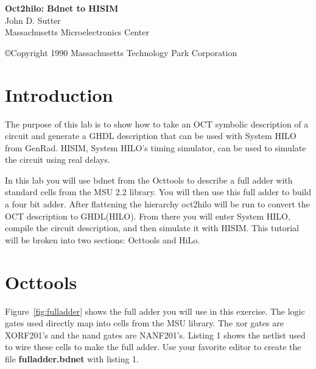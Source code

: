


\begin{titlepage}
\begin{center}
\vspace*{2in}
{\LARGE\bf Oct2hilo: Bdnet to HISIM \\[2ex]}
{\Large John D. Sutter \\[1ex]
Massachusetts Microelectronics Center \\[.5ex]
\mmc}
\end{center}

\vspace*{3.2in}
\copyright Copyright 1990 Massachusetts Technology Park Corporation
\end{titlepage}
\tableofcontents

\newpage

\section{Introduction}

  The purpose of this lab is to show how to take an OCT
symbolic description of a circuit and generate a GHDL
description that can be used with System HILO from GenRad.
HISIM, System HILO's timing simulator, can be used
to simulate the circuit using real delays.

  In this lab you will use bdnet from the Octtools to describe
a full adder with standard cells from the MSU 2.2 library.  
You will then use this full adder to build a four bit adder.  
After flattening the hierarchy oct2hilo will be run to convert
the OCT description to GHDL(HILO).  From there you will enter
System HILO, compile the circuit description, and then simulate
it with HISIM.  This tutorial will be broken into two sections:
Octtools and HiLo.


\section{Octtools}

  Figure~\ref{fig:fulladder} shows the full adder you will 
use in this exercise.
The logic gates used directly map into cells from the MSU
library.  The xor gates are XORF201's and the nand gates are
NANF201's.  Listing 1 shows the netlist used to wire these 
cells to make the full adder.  Use your favorite editor to
create the file {\bf fulladder.bdnet} with listing 1.

